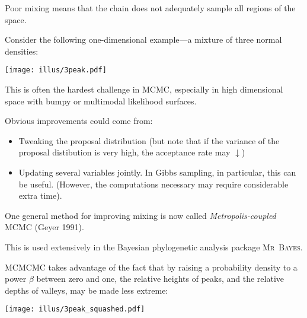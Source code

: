 Poor mixing means that the chain does not adequately sample all regions of the space.  

Consider the following one-dimensional example---a mixture of  three normal densities:

\newpage
\begin{center}
\texttt{[image: illus/3peak.pdf]}
\end{center}
\enlargethispage*{1000pt}

This is often the hardest challenge in MCMC, especially in high dimensional  space with bumpy or multimodal likelihood surfaces.  

Obvious improvements could come from:
\begin{itemize}
\item Tweaking the proposal distribution (but note that if the variance of the proposal distibution is very high, the acceptance rate may $\downarrow$)
\item Updating several variables jointly. In Gibbs sampling, in particular, this can be useful.  (However, the computations necessary may require considerable extra time).
\end{itemize}

One general method for improving mixing is now called {\em Metropolis-coupled} MCMC (Geyer 1991).  

This is used extensively in the Bayesian phylogenetic analysis package \textsc{Mr~Bayes}.

MCMCMC takes advantage of the fact that by raising a probability density to a power $\beta$ between zero and one, the relative heights of peaks, and the relative depths of valleys, may be made less extreme:

\enlargethispage*{100pt}
\vspace*{-.09in}
\begin{center}
\texttt{[image: illus/3peak\_squashed.pdf]}
\end{center}

